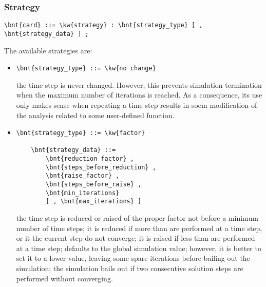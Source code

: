 \subsubsection{Strategy}
\begin{Verbatim}[commandchars=\\\{\}]
    \bnt{card} ::= \kw{strategy} : \bnt{strategy_type} [ , \bnt{strategy_data} ] ;
\end{Verbatim}
The available strategies are:
\begin{itemize}
\item {}
\begin{Verbatim}[commandchars=\\\{\}]
    \bnt{strategy_type} ::= \kw{no change}
\end{Verbatim}
the time step is never changed.
However, this prevents simulation termination when the maximum number
of iterations is reached.
As a consequence, its use only makes sense when repeating a time step
results in soem modification of the analysis related to some user-defined
function.

\item {}
\begin{Verbatim}[commandchars=\\\{\}]
    \bnt{strategy_type} ::= \kw{factor}

    \bnt{strategy_data} ::= 
        \bnt{reduction_factor} ,
        \bnt{steps_before_reduction} ,
        \bnt{raise_factor} ,
        \bnt{steps_before_raise} ,
        \bnt{min_iterations}
        [ , \bnt{max_iterations} ]
\end{Verbatim}
the time step is reduced or raised of the proper factor not before a
minimum number of time steps; it is reduced if more than 
 are performed at a time step, or it the current
step do not converge; it is raised if less
than  are performed at a time step;
 defaults to the global 
simulation value; however, it is better to set it to a lower value,
leaving some spare iterations before bailing out the simulation; 
the simulation bails out if two consecutive solution steps
are performed without converging.


\end{itemize}
